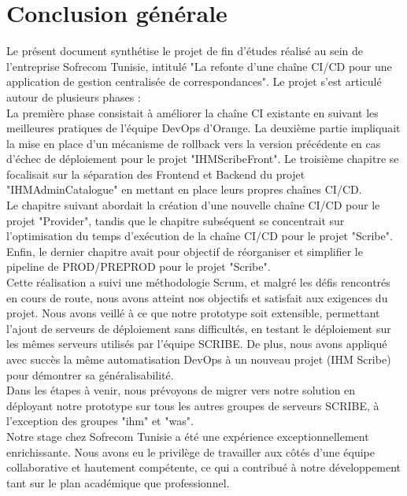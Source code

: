 \chapter*{Conclusion générale}

Le présent document synthétise le projet de fin d'études réalisé au sein de l'entreprise Sofrecom Tunisie, intitulé "La refonte d'une chaîne CI/CD pour une application de gestion centralisée de correspondances". Le projet s'est articulé autour de plusieurs phases :\\

La première phase consistait à améliorer la chaîne CI existante en suivant les meilleures pratiques de l'équipe DevOps d'Orange. La deuxième partie impliquait la mise en place d'un mécanisme de rollback vers la version précédente en cas d'échec de déploiement pour le projet "IHMScribeFront". Le troisième chapitre se focalisait sur la séparation des Frontend et Backend du projet "IHMAdminCatalogue" en mettant en place leurs propres chaînes CI/CD.\\

Le chapitre suivant abordait la création d'une nouvelle chaîne CI/CD pour le projet "Provider", tandis que le chapitre subséquent se concentrait sur l'optimisation du temps d'exécution de la chaîne CI/CD pour le projet "Scribe". Enfin, le dernier chapitre avait pour objectif de réorganiser et simplifier le pipeline de PROD/PREPROD pour le projet "Scribe".\\

Cette réalisation a suivi une méthodologie Scrum, et malgré les défis rencontrés en cours de route, nous avons atteint nos objectifs et satisfait aux exigences du projet. Nous avons veillé à ce que notre prototype soit extensible, permettant l'ajout de serveurs de déploiement sans difficultés, en testant le déploiement sur les mêmes serveurs utilisés par l'équipe SCRIBE. De plus, nous avons appliqué avec succès la même automatisation DevOps à un nouveau projet (IHM Scribe) pour démontrer sa généralisabilité.\\

Dans les étapes à venir, nous prévoyons de migrer vers notre solution en déployant notre prototype sur tous les autres groupes de serveurs SCRIBE, à l'exception des groupes "ihm" et "was".\\

Notre stage chez Sofrecom Tunisie a été une expérience exceptionnellement enrichissante. Nous avons eu le privilège de travailler aux côtés d'une équipe collaborative et hautement compétente, ce qui a contribué à notre développement tant sur le plan académique que professionnel.




